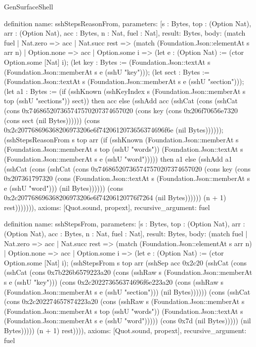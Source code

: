 \begin{lexlean}{GenSurfaceShell}
\begin{semanticmodule}
definition{
  name: sshStepsReasonFrom,
  parameters: [s : Bytes, top : (Option Nat), arr : (Option Nat), acc : Bytes, n : Nat, fuel : Nat],
  result: Bytes,
  body: (match fuel
    | Nat.zero => acc
    | Nat.succ rest => (match (Foundation.Json::elementAt s arr n)
      | Option.none => acc
      | Option.some i => (let e : (Option Nat) := (ctor Option.some [Nat] i); (let key : Bytes := (Foundation.Json::textAt s (Foundation.Json::memberAt s e (sshU "key"))); (let sect : Bytes := (Foundation.Json::textAt s (Foundation.Json::memberAt s e (sshU "section"))); (let a1 : Bytes := (if (sshKnown (sshKeyIndex s (Foundation.Json::memberAt s top (sshU "sections")) sect)) then acc else (sshAdd acc (sshCat (cons (sshCat (cons 0x746865207365747570207374657020 (cons key (cons 0x206f70656e7320 (cons sect (nil Bytes)))))) (cons 0x2c207768696368206973206e6f7420612073656374696f6e (nil Bytes)))))); (sshStepsReasonFrom s top arr (if (sshKnown (Foundation.Json::memberAt s (Foundation.Json::memberAt s top (sshU "words")) (Foundation.Json::textAt s (Foundation.Json::memberAt s e (sshU "word"))))) then a1 else (sshAdd a1 (sshCat (cons (sshCat (cons 0x746865207365747570207374657020 (cons key (cons 0x207361797320 (cons (Foundation.Json::textAt s (Foundation.Json::memberAt s e (sshU "word"))) (nil Bytes)))))) (cons 0x2c207768696368206973206e6f74206120776f7264 (nil Bytes)))))) (n + 1) rest))))))),
  axioms: [Quot.sound, propext],
  recursive_argument: fuel
}

definition{
  name: sshStepsFrom,
  parameters: [s : Bytes, top : (Option Nat), arr : (Option Nat), acc : Bytes, n : Nat, fuel : Nat],
  result: Bytes,
  body: (match fuel
    | Nat.zero => acc
    | Nat.succ rest => (match (Foundation.Json::elementAt s arr n)
      | Option.none => acc
      | Option.some i => (let e : (Option Nat) := (ctor Option.some [Nat] i); (sshStepsFrom s top arr (sshSep acc 0x2c20 (sshCat (cons (sshCat (cons 0x7b226b6579223a20 (cons (sshRaw s (Foundation.Json::memberAt s e (sshU "key"))) (cons 0x2c202273656374696f6e223a20 (cons (sshRaw s (Foundation.Json::memberAt s e (sshU "section"))) (nil Bytes)))))) (cons (sshCat (cons 0x2c202274657874223a20 (cons (sshRaw s (Foundation.Json::memberAt s (Foundation.Json::memberAt s top (sshU "words")) (Foundation.Json::textAt s (Foundation.Json::memberAt s e (sshU "word"))))) (cons 0x7d (nil Bytes))))) (nil Bytes))))) (n + 1) rest)))),
  axioms: [Quot.sound, propext],
  recursive_argument: fuel
}


\end{semanticmodule}
\end{lexlean}
